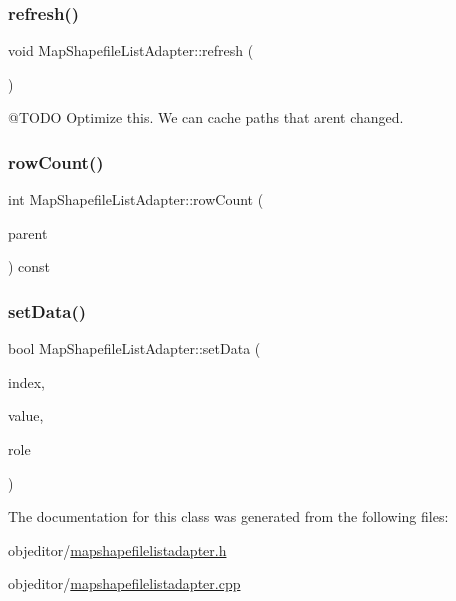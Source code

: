 \subsubsection{\texorpdfstring{refresh()}{refresh()}}
{\footnotesize\ttfamily void Map\+Shapefile\+List\+Adapter\+::refresh (\begin{DoxyParamCaption}{ }\end{DoxyParamCaption})}

@\+T\+O\+DO Optimize this. We can cache paths that aren\textquotesingle{}t changed. \mbox{\label{class_map_shapefile_list_adapter_ae53d6eb19a97bb6edfb1f46ae998c5e4}} 
\subsubsection{\texorpdfstring{rowCount()}{rowCount()}}
{\footnotesize\ttfamily int Map\+Shapefile\+List\+Adapter\+::row\+Count (\begin{DoxyParamCaption}\item[{const Q\+Model\+Index \&}]{parent }\end{DoxyParamCaption}) const\hspace{0.3cm}{\ttfamily [override]}}

\mbox{\label{class_map_shapefile_list_adapter_a62197b2ca2e28597396bafee6c4808bd}} 
\subsubsection{\texorpdfstring{setData()}{setData()}}
{\footnotesize\ttfamily bool Map\+Shapefile\+List\+Adapter\+::set\+Data (\begin{DoxyParamCaption}\item[{const Q\+Model\+Index \&}]{index,  }\item[{const Q\+Variant \&}]{value,  }\item[{int}]{role }\end{DoxyParamCaption})\hspace{0.3cm}{\ttfamily [override]}}



The documentation for this class was generated from the following files\+:\begin{DoxyCompactItemize}
\item 
objeditor/\mbox{\hyperlink{mapshapefilelistadapter_8h}{mapshapefilelistadapter.\+h}}\item 
objeditor/\mbox{\hyperlink{mapshapefilelistadapter_8cpp}{mapshapefilelistadapter.\+cpp}}\end{DoxyCompactItemize}
